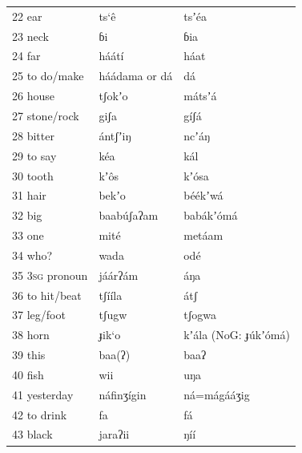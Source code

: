 \documentclass[output=paper]{langsci/langscibook}
\begin{document}
\begin{longtable}{p{}  p{} p{}}
22 ear & ts‘\^{e} & tsʼ\'{e}a \\

23 neck & ɓi & ɓia \\

24 far & h\'{a}\'{a}t\'{i} & h\'{a}at \\

25 to do/make & h\'{a}\'{a}dama  or     d\'{a} & d\'{a} \\

26 house & tʃokʼo & m\'{a}tsʼ\'{a} \\

27 stone/rock & giʃa & g\'{i}ʃ\'{a} \\

28 bitter & \'{a}ntʃʼiŋ & ncʼ\'{a}ŋ \\

29 to say & k\'{e}a & k\'{a}l \\

30 tooth & kʼ\^{o}s & kʼ\'{o}sa \\

31 hair & bekʼo & b\'{e}\'{e}kʼw\'{a} \\

32 big & baab\'{u}ʃaʔam & bab\'{a}kʼ\'{o}m\'{a} \\

33 one & mit\'{e} & met\'{a}am \\

34 who? & wada & od\'{e} \\

35 3\textsc{sg} pronoun & j\'{a}\'{a}rʔ\'{a}m & \'{a}ŋa \\

36 to hit/beat & tʃ\'{i}\'{i}la & \'{a}tʃ \\

37 leg/foot & tʃugw & tʃogwa \\

38 horn & ɟik‘o & kʼ\'{a}la (NoG: ɟ\'{u}kʼ\'{o}m\'{a}) \\

39 this & baa(ʔ) & baaʔ \\

40 fish & wii & uŋa \\

41 yesterday & n\'{a}finʒ\'{i}gin & n\'{a}=m\'{a}g\'{a}\'{a}ʒig \\

42 to drink & fa & f\'{a} \\

43 black & jaraʔii & ŋ\'{i}\'{i} \\


\end{longtable}
\end{document}
